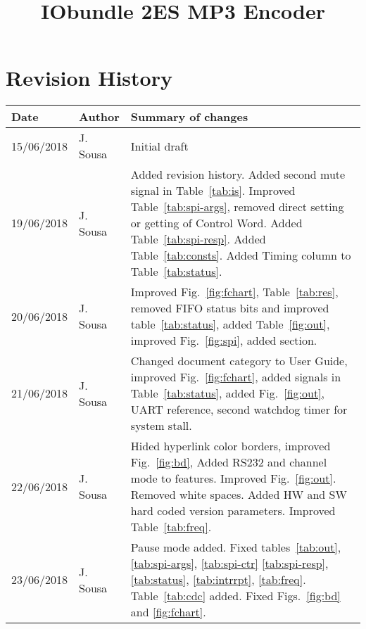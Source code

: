 \documentclass{rep}
\title{IObundle 2ES MP3 Encoder}
\theoremstyle{plain}
\begin{document}
\maketitle
\cleardoublepage
\tableofcontents
\cleardoublepage
\listoftables
\cleardoublepage
\listoffigures
\cleardoublepage

\section*{Revision History}

\begin{table}[H]
  \begin{center}
    \begin{tabular}{|l|l|p{8cm}|}
      \hline
      \rowcolor{iob-green}
      \textbf{Date} & \textbf{Author} & \textbf{Summary of changes} \\
      \hline
      \hline

      15/06/2018 & J. Sousa & Initial draft \\
      \hline

      \rowcolor{iob-blue} 19/06/2018 & J. Sousa & Added revision history. Added
      second mute signal in Table~\ref{tab:is}. Improved
      Table~\ref{tab:spi-args}, removed direct setting or getting of Control
      Word. Added Table~\ref{tab:spi-resp}. Added Table~\ref{tab:consts}.  Added
      Timing column to Table~\ref{tab:status}.\\ \hline

      20/06/2018 & J. Sousa & Improved Fig.~\ref{fig:fchart},
      Table~\ref{tab:res}, removed FIFO status bits and improved
      table~\ref{tab:status}, added Table~\ref{fig:out}, improved
      Fig.~\ref{fig:spi}, added section.\\ \hline

      \rowcolor{iob-blue} 21/06/2018 & J. Sousa & Changed document category to
      User Guide, improved Fig.~\ref{fig:fchart}, added signals in
      Table~\ref{tab:status}, added Fig.~\ref{fig:out}, UART reference, second
      watchdog timer for system stall.\\ \hline

      22/06/2018 & J. Sousa & Hided hyperlink color borders, improved
      Fig.~\ref{fig:bd}, Added RS232 and channel mode to features. Improved
      Fig.~\ref{fig:out}. Removed white spaces. Added HW and SW hard coded
      version parameters. Improved Table~\ref{tab:freq}.\\ \hline

      \rowcolor{iob-blue} 23/06/2018 & J. Sousa & Pause mode added. Fixed
      tables~\ref{tab:out}, \ref{tab:spi-args}, \ref{tab:spi-ctr}
      \ref{tab:spi-resp}, \ref{tab:status}, \ref{tab:intrrpt}, \ref{tab:freq}.
      Table~\ref{tab:cdc} added. Fixed Figs.~\ref{fig:bd} and
      \ref{fig:fchart}.\\ \hline


\end{tabular}
\end{center}
\end{table}
\end{document}

